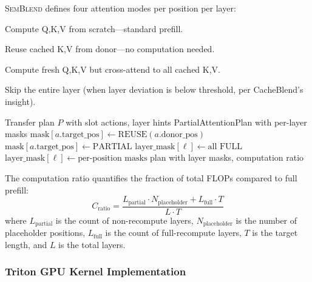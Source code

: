 \documentclass[10pt,twocolumn]{article}
\newcommand{\semblend}{\textsc{SemBlend}\xspace}
\begin{document}
\semblend defines four attention modes per position per layer:

\begin{description}[leftmargin=*,nosep]
\item[FULL] Compute Q,K,V from scratch---standard prefill.
\item[REUSE] Reuse cached K,V from donor---no computation needed.
\item[PARTIAL] Compute fresh Q,K,V but cross-attend to all cached K,V.
\item[SKIP\_LAYER] Skip the entire layer (when layer deviation is below
  threshold, per CacheBlend's insight).
\end{description}

\begin{algorithm}[t]
\caption{Build PartialAttention Plan}
\label{alg:partial}
\begin{algorithmic}[1]
\Require Transfer plan $P$ with slot actions, layer hints
\Ensure PartialAttentionPlan with per-layer masks
    \State $\text{mask}[a.\text{target\_pos}] \gets \text{REUSE}(a.\text{donor\_pos})$
  \Else
    \State $\text{mask}[a.\text{target\_pos}] \gets \text{PARTIAL}$
  \EndIf
\EndFor
\For{each layer $\ell$ in $[0, L)$}
    \State $\text{layer\_mask}[\ell] \gets \text{all FULL}$
  \Else
    \State $\text{layer\_mask}[\ell] \gets \text{per-position masks}$
  \EndIf
\EndFor
\State \Return plan with layer masks, computation ratio
\end{algorithmic}
\end{algorithm}

The computation ratio quantifies the fraction of total FLOPs compared
to full prefill:
\begin{equation}
  C_\text{ratio} = \frac{L_\text{partial} \cdot N_\text{placeholder} + L_\text{full} \cdot T}{L \cdot T}
  \label{eq:cratio}
\end{equation}
where $L_\text{partial}$ is the count of non-recompute layers,
$N_\text{placeholder}$ is the number of placeholder positions,
$L_\text{full}$ is the count of full-recompute layers, $T$ is the target
length, and $L$ is the total layers.

\subsubsection{Triton GPU Kernel Implementation}
\label{sec:triton}
\end{document}

